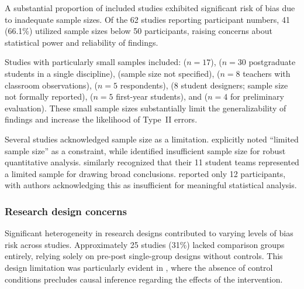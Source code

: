 \documentclass[a4paper,fleqn]{cas-sc}
\begin{document}

A substantial proportion of included studies exhibited significant risk of bias due to inadequate sample sizes. Of the 62 studies reporting participant numbers, 41 (66.1\%) utilized sample sizes below 50 participants, raising concerns about statistical power and reliability of findings.

Studies with particularly small samples included: \citet{1Barbatsis201159} ($n=17$), \citet{6Czerwinski2018} ($n=30$ postgraduate students in a single discipline), \citet{13Humpire2022} (sample size not specified), \citet{21Ghulamani2017} ($n=8$ teachers with classroom observations), \citet{22Nugroho2020149} ($n=5$ respondents), \citet{25Repantis2011502} (8 student designers; sample size not formally reported), \citet{50Lye2013} ($n=5$ first-year students), and \citet{51Ardito2007} ($n=4$ for preliminary evaluation). These small sample sizes substantially limit the generalizability of findings and increase the likelihood of Type~II errors.

Several studies acknowledged sample size as a limitation. \citet{5kazanidis2018alpha} explicitly noted ``limited sample size'' as a constraint, while \citet{11Ternblad2023115} identified insufficient sample size for robust quantitative analysis. \citet{42Huffer201581} similarly recognized that their 11 student teams represented a limited sample for drawing broad conclusions. \citet{63Liu2021} reported only 12 participants, with authors acknowledging this as insufficient for meaningful statistical analysis.

\subsubsection{Research design concerns}

Significant heterogeneity in research designs contributed to varying levels of bias risk across studies. Approximately 25 studies (31\%) lacked comparison groups entirely, relying solely on pre-post single-group designs without controls. This design limitation was particularly evident in \citep{9Lin2018, 16Chen201447, 19Chou2019, 22Nugroho2020149, 45Yu2016727, 52Lin2011265, 63Liu2021, 64Hsu201324, 67Lin201296, 77Ramansyah2021}, where the absence of control conditions precludes causal inference regarding the effects of the intervention.
\end{document}
